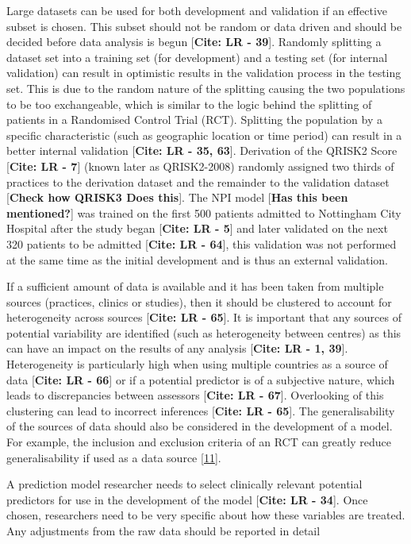 \documentclass[
]{article}
\begin{document}
Large datasets can be used for both development and validation if an effective subset is chosen. This subset should not be random or data driven and should be decided before data analysis is begun {[}\textbf{Cite: LR - 39}{]}. Randomly splitting a dataset set into a training set (for development) and a testing set (for internal validation) can result in optimistic results in the validation process in the testing set. This is due to the random nature of the splitting causing the two populations to be too exchangeable, which is similar to the logic behind the splitting of patients in a Randomised Control Trial (RCT). Splitting the population by a specific characteristic (such as geographic location or time period) can result in a better internal validation {[}\textbf{Cite: LR - 35, 63}{]}. Derivation of the QRISK2 Score {[}\textbf{Cite: LR - 7}{]} (known later as QRISK2-2008) randomly assigned two thirds of practices to the derivation dataset and the remainder to the validation dataset {[}\textbf{Check how QRISK3 Does this}{]}. The NPI model {[}\textbf{Has this been mentioned?}{]} was trained on the first 500 patients admitted to Nottingham City Hospital after the study began {[}\textbf{Cite: LR - 5}{]} and later validated on the next 320 patients to be admitted {[}\textbf{Cite: LR - 64}{]}, this validation was not performed at the same time as the initial development and is thus an external validation.

If a sufficient amount of data is available and it has been taken from multiple sources (practices, clinics or studies), then it should be clustered to account for heterogeneity across sources {[}\textbf{Cite: LR - 65}{]}. It is important that any sources of potential variability are identified (such as heterogeneity between centres) as this can have an impact on the results of any analysis {[}\textbf{Cite: LR - 1, 39}{]}. Heterogeneity is particularly high when using multiple countries as a source of data {[}\textbf{Cite: LR - 66}{]} or if a potential predictor is of a subjective nature, which leads to discrepancies between assessors {[}\textbf{Cite: LR - 67}{]}. Overlooking of this clustering can lead to incorrect inferences {[}\textbf{Cite: LR - 65}{]}. The generalisability of the sources of data should also be considered in the development of a model. For example, the inclusion and exclusion criteria of an RCT can greatly reduce generalisability if used as a data source {[}\protect\hyperlink{ref-moons_prognosis_2009}{11}{]}.

A prediction model researcher needs to select clinically relevant potential predictors for use in the development of the model {[}\textbf{Cite: LR - 34}{]}. Once chosen, researchers need to be very specific about how these variables are treated. Any adjustments from the raw data should be reported in detail
\end{document}
